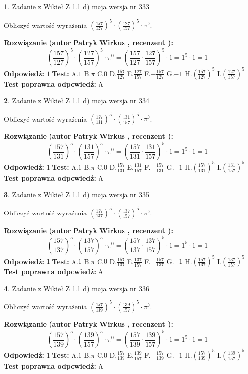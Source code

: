 \documentclass[12pt, a4paper]{article}
\theoremstyle{definition} %
\newtheorem{zad}{}
\newcommand{\zadStart}[1]{\begin{zad}#1\newline}
\newcommand{\zadStop}{\end{zad}}
\newcommand{\rozwStart}[2]{\noindent \textbf{Rozwiązanie (autor #1 , recenzent #2): }\newline}
\newcommand{\rozwStop}{\newline}
\newcommand{\odpStart}{\noindent \textbf{Odpowiedź:}\newline}
\newcommand{\odpStop}{\newline}
\newcommand{\testStart}{\noindent \textbf{Test:}\newline}
\newcommand{\testStop}{\newline}
\newcommand{\kluczStart}{\noindent \textbf{Test poprawna odpowiedź:}\newline}
\newcommand{\kluczStop}{\newline}
\begin{document}
\zadStart{Zadanie z Wikieł Z 1.1 d) moja wersja nr 333}

Obliczyć wartość wyrażenia $(\frac{157}{127})^{5} \cdot (\frac{127}{157})^{5} \cdot \pi^{0}$.
\zadStop
\rozwStart{Patryk Wirkus}{}
$$(\frac{157}{127})^{5} \cdot (\frac{127}{157})^{5} \cdot \pi^{0} = (\frac{157}{127} \cdot \frac{127}{157})^{5} \cdot 1 = 1^{5} \cdot 1 = 1$$
\rozwStop
\odpStart
$1$
\odpStop
\testStart
A.$1$ B.$\pi$ C.$0$ D.$\frac{157}{127}$ E.$\frac{127}{157}$
F.$-\frac{157}{127}$ G.$-1$
H.$(\frac{157}{127})^{5}$
I.$(\frac{127}{157})^{5}$
\testStop
\kluczStart
A
\kluczStop



\zadStart{Zadanie z Wikieł Z 1.1 d) moja wersja nr 334}

Obliczyć wartość wyrażenia $(\frac{157}{131})^{5} \cdot (\frac{131}{157})^{5} \cdot \pi^{0}$.
\zadStop
\rozwStart{Patryk Wirkus}{}
$$(\frac{157}{131})^{5} \cdot (\frac{131}{157})^{5} \cdot \pi^{0} = (\frac{157}{131} \cdot \frac{131}{157})^{5} \cdot 1 = 1^{5} \cdot 1 = 1$$
\rozwStop
\odpStart
$1$
\odpStop
\testStart
A.$1$ B.$\pi$ C.$0$ D.$\frac{157}{131}$ E.$\frac{131}{157}$
F.$-\frac{157}{131}$ G.$-1$
H.$(\frac{157}{131})^{5}$
I.$(\frac{131}{157})^{5}$
\testStop
\kluczStart
A
\kluczStop



\zadStart{Zadanie z Wikieł Z 1.1 d) moja wersja nr 335}

Obliczyć wartość wyrażenia $(\frac{157}{137})^{5} \cdot (\frac{137}{157})^{5} \cdot \pi^{0}$.
\zadStop
\rozwStart{Patryk Wirkus}{}
$$(\frac{157}{137})^{5} \cdot (\frac{137}{157})^{5} \cdot \pi^{0} = (\frac{157}{137} \cdot \frac{137}{157})^{5} \cdot 1 = 1^{5} \cdot 1 = 1$$
\rozwStop
\odpStart
$1$
\odpStop
\testStart
A.$1$ B.$\pi$ C.$0$ D.$\frac{157}{137}$ E.$\frac{137}{157}$
F.$-\frac{157}{137}$ G.$-1$
H.$(\frac{157}{137})^{5}$
I.$(\frac{137}{157})^{5}$
\testStop
\kluczStart
A
\kluczStop



\zadStart{Zadanie z Wikieł Z 1.1 d) moja wersja nr 336}

Obliczyć wartość wyrażenia $(\frac{157}{139})^{5} \cdot (\frac{139}{157})^{5} \cdot \pi^{0}$.
\zadStop
\rozwStart{Patryk Wirkus}{}
$$(\frac{157}{139})^{5} \cdot (\frac{139}{157})^{5} \cdot \pi^{0} = (\frac{157}{139} \cdot \frac{139}{157})^{5} \cdot 1 = 1^{5} \cdot 1 = 1$$
\rozwStop
\odpStart
$1$
\odpStop
\testStart
A.$1$ B.$\pi$ C.$0$ D.$\frac{157}{139}$ E.$\frac{139}{157}$
F.$-\frac{157}{139}$ G.$-1$
H.$(\frac{157}{139})^{5}$
I.$(\frac{139}{157})^{5}$
\testStop
\kluczStart
A
\kluczStop
\end{document}
